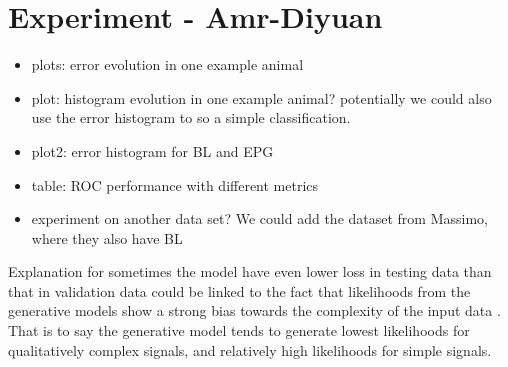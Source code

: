 \documentclass[pmlr]{jmlr}%
\begin{document}





\section{Experiment - Amr-Diyuan}

\begin{itemize}
	\item plots: error evolution in one example animal
	\item plot: histogram evolution in one example animal? potentially we could also use the error histogram to so a simple classification.
	\item plot2: error histogram for BL and EPG
	\item table: ROC performance with different metrics
	\item experiment on another data set? We could add the dataset from Massimo, where they also have BL
\end{itemize}

Explanation for sometimes the model have even lower loss in testing data than that in validation data could be linked to the fact that likelihoods from the generative models show a strong bias towards the complexity of the input data \cite{serra2019input, schirrmeister2020understanding, ren2019likelihood}. That is to say the generative model tends to generate lowest likelihoods for qualitatively complex signals, and relatively high likelihoods for simple signals.
\end{document}
